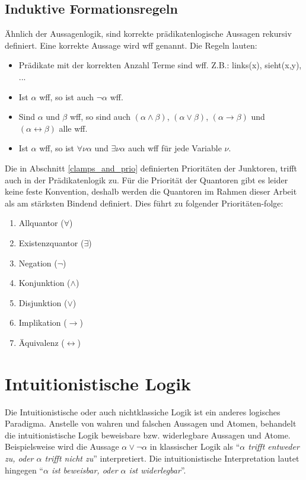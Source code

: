 \subsection{Induktive Formationsregeln}
Ähnlich der Aussagenlogik, sind korrekte prädikatenlogische Aussagen rekursiv definiert. Eine korrekte Aussage wird \ac{wff} genannt. Die Regeln lauten:
\begin{itemize}
\item
Prädikate mit der korrekten Anzahl Terme sind \ac{wff}. Z.B.: links(x), sieht(x,y), ...

\item
Ist $\alpha$ \ac{wff}, so ist auch $\neg\alpha$ \ac{wff}.

\item
Sind $\alpha$ und $\beta$ \ac{wff}, so sind auch $(\alpha\wedge\beta)$, $(\alpha\vee\beta)$, $(\alpha\rightarrow\beta)$ und $(\alpha\leftrightarrow\beta)$ alle \ac{wff}.

\item
Ist $\alpha$ \ac{wff}, so ist $\forall\nu\alpha$ und $\exists\nu\alpha$ auch \ac{wff} für jede Variable $\nu$.
\end{itemize}

Die in Abschnitt \ref{clamps_and_prio} definierten Prioritäten der Junktoren, trifft auch in der Prädikatenlogik zu. Für die Priorität der Quantoren gibt es leider keine feste Konvention, deshalb werden die Quantoren im Rahmen dieser Arbeit als am stärksten Bindend definiert. Dies führt zu folgender Prioritäten-folge:
\begin{enumerate}
\item Allquantor ($\forall$)
\item Existenzquantor ($\exists$)
\item Negation ($\neg$)
\item Konjunktion ($\wedge$)
\item Disjunktion ($\vee$)
\item Implikation ($\rightarrow$)
\item Äquivalenz ($\leftrightarrow$)
\end{enumerate}

\section{Intuitionistische Logik}
Die Intuitionistische oder auch nichtklassiche Logik ist ein anderes logisches Paradigma. Anstelle von wahren und falschen Aussagen und Atomen, behandelt die intuitionistische Logik beweisbare bzw. widerlegbare Aussagen und Atome. Beispielsweise wird die Aussage $\alpha\vee\neg\alpha$ in klassischer Logik als ``\textit{$\alpha$ trifft entweder zu, oder $\alpha$ trifft nicht zu}'' interpretiert. Die intuitionistische Interpretation lautet hingegen ``\textit{$\alpha$ ist beweisbar, oder $\alpha$ ist widerlegbar}''.

